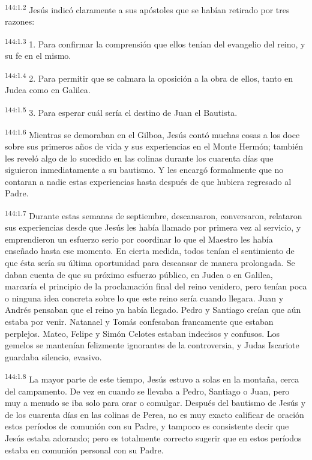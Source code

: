 \par 
\textsuperscript{144:1.2} Jesús indicó claramente a sus apóstoles que se habían retirado por tres razones:

\par 
\textsuperscript{144:1.3} 1. Para confirmar la comprensión que ellos tenían del evangelio del reino, y su fe en el mismo.

\par 
\textsuperscript{144:1.4} 2. Para permitir que se calmara la oposición a la obra de ellos, tanto en Judea como en Galilea.

\par 
\textsuperscript{144:1.5} 3. Para esperar cuál sería el destino de Juan el Bautista.

\par 
\textsuperscript{144:1.6} Mientras se demoraban en el Gilboa, Jesús contó muchas cosas a los doce sobre sus primeros años de vida y sus experiencias en el Monte Hermón; también les reveló algo de lo sucedido en las colinas durante los cuarenta días que siguieron inmediatamente a su bautismo. Y les encargó formalmente que no contaran a nadie estas experiencias hasta después de que hubiera regresado al Padre.

\par 
\textsuperscript{144:1.7} Durante estas semanas de septiembre, descansaron, conversaron, relataron sus experiencias desde que Jesús les había llamado por primera vez al servicio, y emprendieron un esfuerzo serio por coordinar lo que el Maestro les había enseñado hasta ese momento. En cierta medida, todos tenían el sentimiento de que ésta sería su última oportunidad para descansar de manera prolongada. Se daban cuenta de que su próximo esfuerzo público, en Judea o en Galilea, marcaría el principio de la proclamación final del reino venidero, pero tenían poca o ninguna idea concreta sobre lo que este reino sería cuando llegara. Juan y Andrés pensaban que el reino ya había llegado. Pedro y Santiago creían que aún estaba por venir. Natanael y Tomás confesaban francamente que estaban perplejos. Mateo, Felipe y Simón Celotes estaban indecisos y confusos. Los gemelos se mantenían felizmente ignorantes de la controversia, y Judas Iscariote guardaba silencio, evasivo.

\par 
\textsuperscript{144:1.8} La mayor parte de este tiempo, Jesús estuvo a solas en la montaña, cerca del campamento. De vez en cuando se llevaba a Pedro, Santiago o Juan, pero muy a menudo se iba solo para orar o comulgar. Después del bautismo de Jesús y de los cuarenta días en las colinas de Perea, no es muy exacto calificar de oración estos períodos de comunión con su Padre, y tampoco es consistente decir que Jesús estaba adorando; pero es totalmente correcto sugerir que en estos períodos estaba en comunión personal con su Padre.

